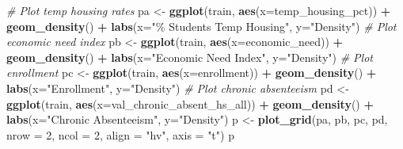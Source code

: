 \documentclass[
  man,floatsintext]{apa6}
\newenvironment{Shaded}{\begin{snugshade}}{\end{snugshade}}
\newcommand{\AttributeTok}[1]{\textcolor[rgb]{0.13,0.29,0.53}{#1}}
\newcommand{\CommentTok}[1]{\textcolor[rgb]{0.56,0.35,0.01}{\textit{#1}}}
\newcommand{\DecValTok}[1]{\textcolor[rgb]{0.00,0.00,0.81}{#1}}
\newcommand{\FunctionTok}[1]{\textcolor[rgb]{0.13,0.29,0.53}{\textbf{#1}}}
\newcommand{\NormalTok}[1]{#1}
\newcommand{\OtherTok}[1]{\textcolor[rgb]{0.56,0.35,0.01}{#1}}
\newcommand{\SpecialCharTok}[1]{\textcolor[rgb]{0.81,0.36,0.00}{\textbf{#1}}}
\newcommand{\StringTok}[1]{\textcolor[rgb]{0.31,0.60,0.02}{#1}}
\begin{document}
\begin{Shaded}
\begin{Highlighting}[]
\CommentTok{\# Plot temp housing rates}
\NormalTok{pa }\OtherTok{\textless{}{-}} \FunctionTok{ggplot}\NormalTok{(train, }\FunctionTok{aes}\NormalTok{(}\AttributeTok{x=}\NormalTok{temp\_housing\_pct)) }\SpecialCharTok{+}
    \FunctionTok{geom\_density}\NormalTok{() }\SpecialCharTok{+}
    \FunctionTok{labs}\NormalTok{(}\AttributeTok{x=}\StringTok{"\% Students Temp Housing"}\NormalTok{, }\AttributeTok{y=}\StringTok{"Density"}\NormalTok{)}
\CommentTok{\# Plot economic need index}
\NormalTok{pb }\OtherTok{\textless{}{-}} \FunctionTok{ggplot}\NormalTok{(train, }\FunctionTok{aes}\NormalTok{(}\AttributeTok{x=}\NormalTok{economic\_need)) }\SpecialCharTok{+}
    \FunctionTok{geom\_density}\NormalTok{() }\SpecialCharTok{+}
    \FunctionTok{labs}\NormalTok{(}\AttributeTok{x=}\StringTok{"Economic Need Index"}\NormalTok{, }\AttributeTok{y=}\StringTok{"Density"}\NormalTok{)}
\CommentTok{\# Plot enrollment}
\NormalTok{pc }\OtherTok{\textless{}{-}} \FunctionTok{ggplot}\NormalTok{(train, }\FunctionTok{aes}\NormalTok{(}\AttributeTok{x=}\NormalTok{enrollment)) }\SpecialCharTok{+}
    \FunctionTok{geom\_density}\NormalTok{() }\SpecialCharTok{+}
    \FunctionTok{labs}\NormalTok{(}\AttributeTok{x=}\StringTok{"Enrollment"}\NormalTok{, }\AttributeTok{y=}\StringTok{"Density"}\NormalTok{)}
\CommentTok{\# Plot chronic absenteeism}
\NormalTok{pd }\OtherTok{\textless{}{-}} \FunctionTok{ggplot}\NormalTok{(train, }\FunctionTok{aes}\NormalTok{(}\AttributeTok{x=}\NormalTok{val\_chronic\_absent\_hs\_all)) }\SpecialCharTok{+}
    \FunctionTok{geom\_density}\NormalTok{() }\SpecialCharTok{+}
    \FunctionTok{labs}\NormalTok{(}\AttributeTok{x=}\StringTok{"Chronic Absenteeism"}\NormalTok{, }\AttributeTok{y=}\StringTok{"Density"}\NormalTok{)}
\NormalTok{p }\OtherTok{\textless{}{-}} \FunctionTok{plot\_grid}\NormalTok{(pa, pb, pc, pd, }\AttributeTok{nrow =} \DecValTok{2}\NormalTok{, }\AttributeTok{ncol =} \DecValTok{2}\NormalTok{, }\AttributeTok{align =} \StringTok{"hv"}\NormalTok{, }\AttributeTok{axis =} \StringTok{"t"}\NormalTok{)}
\NormalTok{p}


\end{Highlighting}
\end{Shaded}
\end{document}

